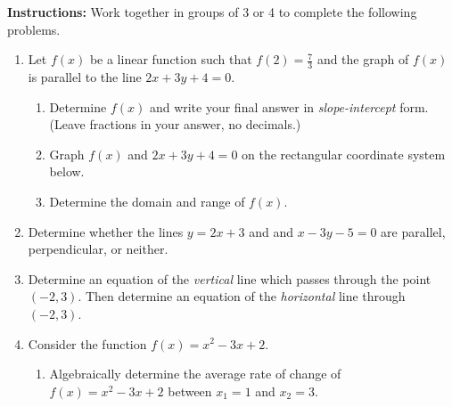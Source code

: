 



\noindent \textbf{Instructions:}  Work together in groups of  3 or 4 to complete the following problems.




\begin{enumerate}
\item Let $f(x)$ be a linear function such that $\displaystyle f(2)=\frac{7}{3}$ and the graph of $f(x)$ is parallel to the line $2x+3y+4=0$. 
\begin{enumerate}
\item Determine $f(x)$ and write your final answer in \emph{slope-intercept} form. (Leave fractions in your answer, no decimals.)
\vfill
\item Graph $f(x)$ and  $2x+3y+4=0$ on the rectangular coordinate system below.\\

\item Determine the domain and range of $f(x)$.\\[.5in]
\end{enumerate}


\newpage
\item Determine whether the lines $y= 2x+3$ and and $x-3y-5=0$ are parallel, perpendicular, or neither. \vfill


\item Determine an equation of the \emph{vertical} line which passes through the point $(-2, 3)$. Then determine an equation of the \emph{horizontal} line through $(-2,3)$.\vfill

\newpage

\item Consider the function $f(x)=x^2-3x+2$.
\begin{enumerate}
\item Algebraically determine the average rate of change of $f(x)=x^2-3x+2$ between $x_1=1$ and $x_2=3$.
\vfill




\end{enumerate}
\end{enumerate}
